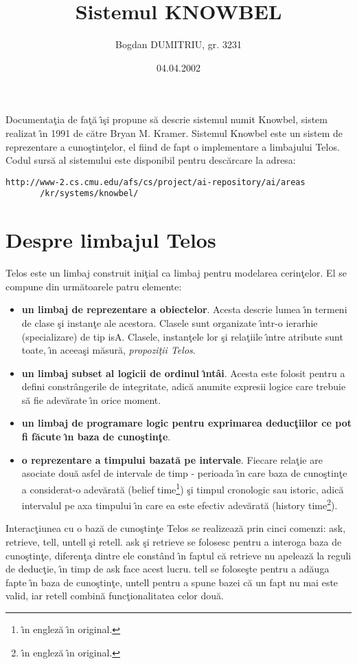 \documentclass{article}
\title{Sistemul KNOWBEL}
\author{Bogdan DUMITRIU, gr. 3231}
\date{04.04.2002}
\begin{document}
\tableofcontents
\maketitle
Documenta\c{t}ia de fa\c{t}\u{a} \^{\i}\c{s}i propune s\u{a} descrie sistemul
numit Knowbel, sistem realizat \^{\i}n 1991 de c\u{a}tre Bryan M. Kramer. 
Sistemul Knowbel este un sistem de reprezentare a cuno\c{s}tin\c{t}elor, el fiind
de fapt o implementare a limbajului Telos. Codul surs\u{a} al sistemului este
disponibil pentru desc\u{a}rcare la adresa:
\begin{verbatim}
http://www-2.cs.cmu.edu/afs/cs/project/ai-repository/ai/areas
       /kr/systems/knowbel/
\end{verbatim}

\section{Despre limbajul Telos}
Telos este un limbaj construit ini\c{t}ial ca limbaj pentru modelarea cerin\c{t}elor.
El se compune din urm\u{a}toarele patru elemente:
\begin{itemize}
\item {\bf un limbaj de reprezentare a obiectelor}. Acesta descrie lumea \^{\i}n termeni
de clase \c{s}i instan\c{t}e ale acestora. Clasele sunt organizate \^{\i}ntr-o
ierarhie (specializare) de tip isA. Clasele, instan\c{t}ele lor \c{s}i rela\c{t}iile
\^{\i}ntre atribute sunt toate, \^{\i}n aceea\c{s}i m\u{a}sur\u{a}, {\it propozi\c{t}ii
Telos}.
\item {\bf un limbaj subset al logicii de ordinul \^{\i}nt\^{a}i}. Acesta este folosit
pentru a defini constr\^{a}ngerile de integritate, adic\u{a} anumite expresii logice
care trebuie s\u{a} fie adev\u{a}rate \^{\i}n orice moment.
\item {\bf un limbaj de programare logic pentru exprimarea deduc\c{t}iilor ce pot fi
f\u{a}cute \^{\i}n baza de cuno\c{s}tin\c{t}e}.
\item {\bf o reprezentare a timpului bazat\u{a} pe intervale}. Fiecare rela\c{t}ie
are asociate dou\u{a} asfel de intervale de timp - perioada \^{\i}n care baza de
cuno\c{s}tin\c{t}e a considerat-o adev\u{a}rat\u{a} (belief time\footnote{\^{\i}n
englez\u{a} \^{\i}n original.}) \c{s}i timpul cronologic sau istoric, adic\u{a}
intervalul pe axa timpului \^{\i}n care ea este efectiv adev\u{a}rat\u{a} (history
time\footnote{\^{\i}n englez\u{a} \^{\i}n original.}).
\end{itemize}
Interac\c{t}iunea cu o baz\u{a} de cuno\c{s}tin\c{t}e Telos se realizeaz\u{a} prin
cinci comenzi: {\sc ask, retrieve, tell, untell} \c{s}i {\sc retell}. {\sc ask}
\c{s}i {\sc retrieve} se folosesc pentru a interoga baza de cuno\c{s}tin\c{t}e,
diferen\c{t}a dintre ele const\^{a}nd \^{\i}n faptul c\u{a} {\sc retrieve} nu
apeleaz\u{a} la reguli de deduc\c{t}ie, \^{\i}n timp de {\sc ask} face acest lucru.
{\sc tell} se folose\c{s}te pentru a ad\u{a}uga fapte \^{\i}n baza de cuno\c{s}tin\c{t}e,
{\sc untell} pentru a spune bazei c\u{a} un fapt nu mai este valid, iar {\sc retell}
combin\u{a} func\c{t}ionalitatea celor dou\u{a}.
\end{document}
